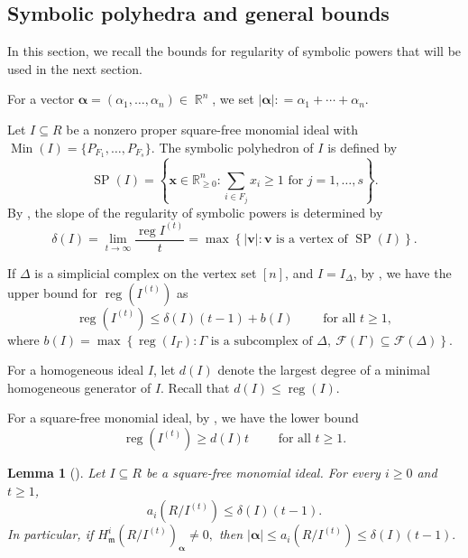 \documentclass[12pt]{amsart}
\newtheorem{lemma}[proposition]{Lemma}
\DeclareMathOperator{\R}{\mathbb {R}}
\DeclareMathOperator{\reg}{reg}
\DeclareMathOperator{\Min}{Min}
\def\alb {\boldsymbol {\alpha}}
\begin{document}
\subsection{Symbolic polyhedra and general bounds}

In this section, we recall the bounds for regularity of symbolic powers that will be used in the next section. 

For a vector $\alb = (\alpha_1,\ldots,\alpha_n)\in\R^n$, we set $|\alb| : = \alpha_1+\cdots+\alpha_n$.

Let \(I\subseteq R\) be a nonzero proper square-free monomial ideal with \(\Min(I)=\{P_{F_1},\ldots,P_{F_s}\}.\) The symbolic polyhedron of \(I\) is defined by 
\[
\operatorname{SP}(I)
=
\left\{
\boldsymbol x\in\mathbb R_{\ge0}^n:
\sum_{i\in F_j}x_i\ge1
\text{ for }j=1,\ldots,s
\right\}.
\]
By \cite[Equation~(4)]{HT}, the slope of the regularity of symbolic powers is determined by
\[
\delta(I)
=
\lim_{t\to\infty}\frac{\reg I^{(t)}}t
=
\max\left\{
|\boldsymbol v|:
\boldsymbol v\text{ is a vertex of }\operatorname{SP}(I)
\right\}.
\]


If $\Delta$ is a simplicial complex on the vertex set $[n]$, and \(I=I_\Delta\), by \cite[Theorem~2.3]{HT}, we have the upper bound for $\reg(I^{(t)})$ as 
\begin{equation}\label{eq:general-symbolic-bound}
\reg(I^{(t)})
\le
\delta(I)(t-1)+b(I)
\qquad \text{ for all }  t \ge 1,
\end{equation}
where $b(I)
=
\max\left\{
\reg(I_\Gamma):
\Gamma\text{ is a subcomplex of }\Delta,\ 
\mathcal F(\Gamma)\subseteq\mathcal F(\Delta)
\right\}.$

For a homogeneous ideal \(I\), let \(d(I)\) denote the largest degree of a minimal homogeneous generator of \(I\). Recall that $ d(I) \le \reg(I). $

For a square-free monomial ideal, by \cite[Remark~2.8]{HT},  we have the lower bound
\begin{equation}\label{eq:general-symbolic-lower}
\reg(I^{(t)}) \ge d(I)t \qquad \text{ for all } t\ge1.
\end{equation}


\begin{lemma}[{\cite[Theorem~2.2]{HT}}]\label{HT}
Let \(I\subseteq R\) be a square-free monomial ideal. For every \(i\ge0\) and \(t\ge1\),
\[
a_i(R/I^{(t)})
\le
\delta(I)(t-1).
\]
In particular, if $H^i_{\mathfrak m}(R/I^{(t)})_{\boldsymbol\alpha}\ne 0,$
then $ |\boldsymbol\alpha| \le a_i(R/I^{(t)}) \le \delta(I)(t-1).$
\end{lemma}
\end{document}
